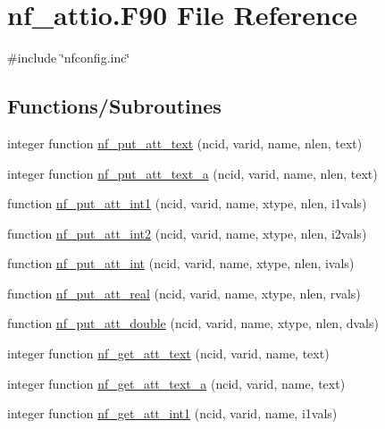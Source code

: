 \hypertarget{nf__attio_8F90}{}\section{nf\+\_\+attio.\+F90 File Reference}
\label{nf__attio_8F90}
{\ttfamily \#include \char`\"{}nfconfig.\+inc\char`\"{}}\newline
\subsection*{Functions/\+Subroutines}
\begin{DoxyCompactItemize}
\item 
integer function \hyperlink{nf__attio_8F90_a1a21947585dcb6201aefedb36a038b6a}{nf\+\_\+put\+\_\+att\+\_\+text} (ncid, varid, name, nlen, text)
\item 
integer function \hyperlink{nf__attio_8F90_a09bd32157a8ceb738172fade0722ffb8}{nf\+\_\+put\+\_\+att\+\_\+text\+\_\+a} (ncid, varid, name, nlen, text)
\item 
function \hyperlink{nf__attio_8F90_a28b1e4fbb5cb59152c3752eccae5a35e}{nf\+\_\+put\+\_\+att\+\_\+int1} (ncid, varid, name, xtype, nlen, i1vals)
\item 
function \hyperlink{nf__attio_8F90_a8914ddb3595b3a3c507a0b1374408b4c}{nf\+\_\+put\+\_\+att\+\_\+int2} (ncid, varid, name, xtype, nlen, i2vals)
\item 
function \hyperlink{nf__attio_8F90_ab2a527a5b813ced347f63c07c60f2f7a}{nf\+\_\+put\+\_\+att\+\_\+int} (ncid, varid, name, xtype, nlen, ivals)
\item 
function \hyperlink{nf__attio_8F90_ad80e732c2596e52974c07adbf3a9e8a9}{nf\+\_\+put\+\_\+att\+\_\+real} (ncid, varid, name, xtype, nlen, rvals)
\item 
function \hyperlink{nf__attio_8F90_ad608794165b454b88582bf994f472c39}{nf\+\_\+put\+\_\+att\+\_\+double} (ncid, varid, name, xtype, nlen, dvals)
\item 
integer function \hyperlink{nf__attio_8F90_a5dc31d1a771da746f09a58761d5bee49}{nf\+\_\+get\+\_\+att\+\_\+text} (ncid, varid, name, text)
\item 
integer function \hyperlink{nf__attio_8F90_afcd4d2a0409289eab4c4354afef06545}{nf\+\_\+get\+\_\+att\+\_\+text\+\_\+a} (ncid, varid, name, text)
\item 
integer function \hyperlink{nf__attio_8F90_abd56e4abcec624f4ca5a26c93ed87c18}{nf\+\_\+get\+\_\+att\+\_\+int1} (ncid, varid, name, i1vals)
\item 

\end{DoxyCompactItemize}
